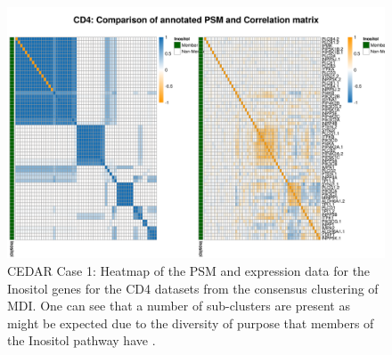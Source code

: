 \documentclass[12pt]{article} %
\begin{document}
	\begin{figure}
		\centering
		\includegraphics[scale=0.75]{Images/Biology_data/Set_250/All_datasets/Heatmaps/KEGG_INOSITOL_PHOSPHATE_METABOLISM/CD4_comp_psm_corr.png}
		\caption{CEDAR Case 1: Heatmap of the PSM and expression data for the Inositol genes for the CD4 datasets from the consensus clustering of MDI. One can see that a number of sub-clusters are present as might be expected due to the diversity of purpose that members of the Inositol pathway have \citep{monserrate2010inositol}.}
		\label{fig:results:cedar_1:mdi_cd4_inostiol_psm_cor}
	\end{figure}
\end{document}
